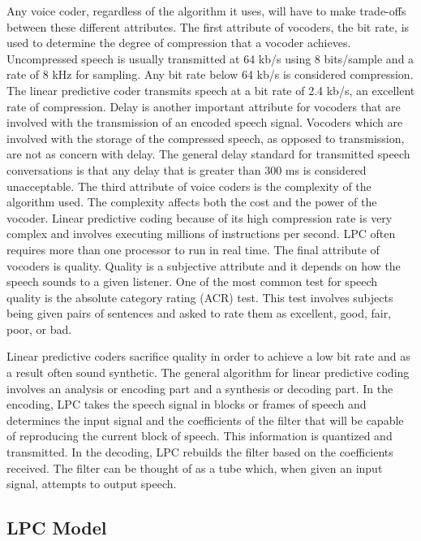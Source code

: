 \documentclass[12pt, a4paper, twoside]{report}
\begin{document}
Any voice coder, regardless of the algorithm it uses, will have to make trade-offs between these different attributes. The first attribute of vocoders, the bit rate, is used to determine the degree of compression that a vocoder achieves. Uncompressed speech is usually transmitted at 64 kb/s using 8 bits/sample and a rate of 8 kHz for sampling. Any bit rate below 64 kb/s is considered compression. The linear predictive coder transmits speech at a bit rate of 2.4 kb/s, an excellent rate of compression. Delay is another important attribute for vocoders that are involved with the transmission of an encoded speech signal. Vocoders which are involved with the storage of the compressed speech, as opposed to transmission, are not as concern with delay. The general delay standard for transmitted speech conversations is that any delay that is greater than 300 ms is considered unacceptable. The third attribute of voice coders is the complexity of the algorithm used. The complexity affects both the cost and the power of the vocoder. Linear predictive coding because of its high compression rate is very complex and involves executing millions of instructions per second. LPC often requires more than one processor to run in real time. The final attribute of vocoders is quality. Quality is a subjective attribute and it depends on how the speech sounds to a given listener. One of the most common test for speech quality is the absolute category rating (ACR) test. This test involves subjects being given pairs of sentences and asked to rate them as excellent, good, fair, poor, or bad.

Linear predictive coders sacrifice quality in order to achieve a low bit rate and as a result often sound synthetic. The general algorithm for linear predictive coding involves an analysis or encoding part and a synthesis or decoding part. In the encoding, LPC takes the speech signal in blocks or frames of speech and determines the input signal and the coefficients of the filter that will be capable of reproducing the current block of speech. This information is quantized and transmitted. In the decoding, LPC rebuilds the filter based on the coefficients received. The filter can be thought of as a tube which, when given an input signal, attempts to output speech.

\subsection{LPC Model}
\end{document}
